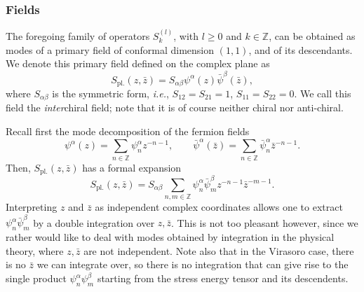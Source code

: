 \documentclass[11pt]{article}
\newcommand{\oZ}{\mathbb{Z}}
\newcommand{\bz}{\bar{z}}
\newcommand{\enrg}{S}
\newcommand{\enrgpl}{\enrg_{\text{pl.}}}
\theoremstyle{definition}
\begin{document}
\subsubsection{Fields}\label{sec:interch-field}


The foregoing family of operators
$\enrg^{(l)}_k$, with $l\geq0$ and $k\in\oZ$, can be obtained as modes
of a primary field of conformal dimension $(1,1)$, and of its
descendants. We denote this primary
field defined on the complex plane as
\begin{equation}\label{enrg-field-pl}
\enrg_{\text{pl.}}(z,\bz)=S_{\alpha\beta}\psi^{\alpha}(z)\bar{\psi}^{\beta}(\bz),
\end{equation}
where  $S_{\alpha\beta}$ is the symmetric form, {\it i.e.}, $S_{12}=S_{21}=1$, $S_{11}=S_{22}=0$. We  call this field the \textit{inter}chiral field; note that it is of course  neither chiral nor anti-chiral.

Recall first the mode decomposition of the fermion fields
\begin{equation}
\psi^{\alpha}(z) = \sum_{n\in\oZ}\psi^{\alpha}_n z^{-n-1},\qquad \bar{\psi}^{\alpha}(\bz) = \sum_{n\in\oZ}\bar{\psi}^{\alpha}_n \bz^{-n-1}.
\end{equation}
Then,  $\enrgpl(z,\bz)$ has a formal expansion
\begin{equation}\label{enrgpl-mod-exp}
\enrgpl(z,\bz) =  S_{\alpha\beta} \sum_{n,m\in\oZ}\psi^{\alpha}_n \bar{\psi}^{\beta}_m  z^{-n-1}\bz^{-m-1}.
\end{equation}
Interpreting  $z$ and $\bz$  as independent complex coordinates allows one to extract $\psi^{\alpha}_n \bar{\psi}^{\beta}_m$ by a double integration over $z,\bz$. This is not too pleasant however, since we rather would like to deal with modes obtained by  integration in the physical theory, where $z,\bz$ are not independent. Note also that in the Virasoro case, there is no $\bz$ we can integrate over, so there is no integration that can give rise to the single product $\psi^{\alpha}_n \psi^{\beta}_m$ starting from the stress energy tensor and its descendents.
\end{document}
